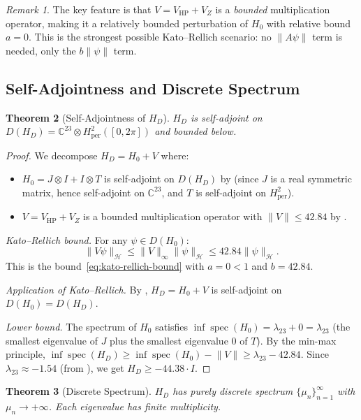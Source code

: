 \documentclass[11pt,a4paper]{article}
\theoremstyle{plain}
\newtheorem{theorem}{Theorem}[section]
\theoremstyle{remark}
\newtheorem{remark}[theorem]{Remark}
\newcommand{\C}{\mathbb{C}}
\newcommand{\HH}{\mathcal{H}}
\DeclareMathOperator{\spec}{spec}
\newcommand{\norm}[1]{\lVert #1 \rVert}
\begin{document}
\begin{remark}
The key feature is that $V=V_{\mathrm{HP}}+V_Z$ is a \emph{bounded}
multiplication operator, making it a relatively bounded perturbation of
$H_0$ with relative bound $a=0$.  This is the strongest possible Kato--Rellich
scenario: no $\norm{A\psi}$ term is needed, only the $b\norm{\psi}$ term.
\end{remark}

\subsection{Self-Adjointness and Discrete Spectrum}

\begin{theorem}[Self-Adjointness of $H_D$]\label{thm:self-adjoint}
$H_D$ is self-adjoint on $D(H_D)=\C^{23}\otimes H^2_{\mathrm{per}}([0,2\pi])$
and bounded below.
\end{theorem}

\begin{proof}
We decompose $H_D=H_0+V$ where:
\begin{itemize}[nosep]
  \item $H_0=J\otimes I+I\otimes T$ is self-adjoint on $D(H_D)$ by
         (since $J$ is a real symmetric matrix,
        hence self-adjoint on $\C^{23}$, and $T$ is self-adjoint on
        $H^2_{\mathrm{per}}$).
  \item $V=V_{\mathrm{HP}}+V_Z$ is a bounded multiplication operator
        with $\norm{V}\leq 42.84$ by .
\end{itemize}

\emph{Kato--Rellich bound.}  For any $\psi\in D(H_0)$:
\[
  \norm{V\psi}_\HH\leq\norm{V}_\infty\norm{\psi}_\HH\leq 42.84\norm{\psi}_\HH.
\]
This is the bound~\eqref{eq:kato-rellich-bound} with $a=0<1$ and $b=42.84$.

\emph{Application of Kato--Rellich.}  By ,
$H_D=H_0+V$ is self-adjoint on $D(H_0)=D(H_D)$.

\emph{Lower bound.}  The spectrum of $H_0$ satisfies
$\inf\spec(H_0)=\lambda_{23}+0=\lambda_{23}$ (the smallest eigenvalue
of $J$ plus the smallest eigenvalue $0$ of $T$).  By the min-max principle,
$\inf\spec(H_D)\geq\inf\spec(H_0)-\norm{V}\geq\lambda_{23}-42.84$.
Since $\lambda_{23}\approx -1.54$ (from ), we get
$H_D\geq -44.38\cdot I$.
\end{proof}

\begin{theorem}[Discrete Spectrum]\label{thm:discrete}
$H_D$ has purely discrete spectrum $\{\mu_n\}_{n=1}^\infty$ with
$\mu_n\to+\infty$.  Each eigenvalue has finite multiplicity.
\end{theorem}
\end{document}
